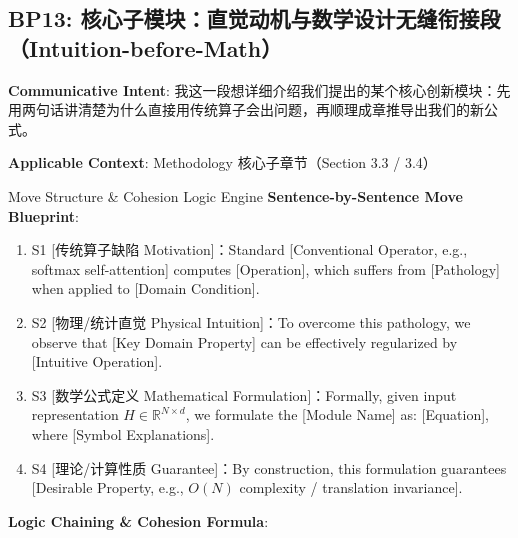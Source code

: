 \subsection{BP13: 核心子模块：直觉动机与数学设计无缝衔接段（Intuition-before-Math）}\label{sec:bp:BP13}
\noindent\textbf{\color{AcadNavy}Communicative Intent}: 我这一段想详细介绍我们提出的某个核心创新模块：先用两句话讲清楚为什么直接用传统算子会出问题，再顺理成章推导出我们的新公式。\par\vspace{2pt}
\noindent\textbf{\color{AcadSlate}Applicable Context}: Methodology 核心子章节（Section 3.3 / 3.4）\par\vspace{4pt}
\begin{ConceptBox}{Move Structure \& Cohesion Logic Engine}
\textbf{Sentence-by-Sentence Move Blueprint}:
\begin{enumerate}[label=\textbf{\color{AcadNavy}S\arabic*.}, leftmargin=2em, itemsep=2pt]
  \item S1 [传统算子缺陷 Motivation]：Standard [Conventional Operator, e.g., softmax self-attention] computes [Operation], which suffers from [Pathology] when applied to [Domain Condition].
  \item S2 [物理/统计直觉 Physical Intuition]：To overcome this pathology, we observe that [Key Domain Property] can be effectively regularized by [Intuitive Operation].
  \item S3 [数学公式定义 Mathematical Formulation]：Formally, given input representation $H \in \mathbb{R}^{N \times d}$, we formulate the [Module Name] as: [Equation], where [Symbol Explanations].
  \item S4 [理论/计算性质 Guarantee]：By construction, this formulation guarantees [Desirable Property, e.g., $O(N)$ complexity / translation invariance].
\end{enumerate}\par\vspace{4pt}
\textbf{Logic Chaining \& Cohesion Formula}:\par{}
\end{ConceptBox}
